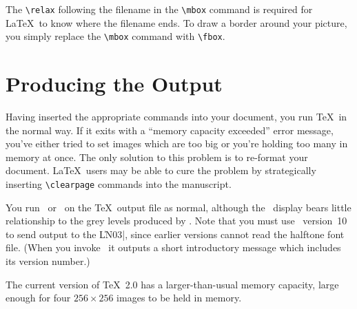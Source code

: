 \noindent The \verb|\relax| following the filename in the \verb|\mbox| command
is required for \LaTeX\ to know where the filename ends. To draw a border
around your picture, you simply replace the \verb|\mbox| command with
\verb|\fbox|. 

\section{Producing the Output}

Having inserted the appropriate commands into your document, you run \TeX\ in
the normal way. If it exits with a ``memory capacity exceeded'' error message,
you've either tried to set images which are too big or you're holding too
many in memory at once.  The only solution to this problem is to re-format your
document. \LaTeX\ users may be able to cure the problem by strategically
inserting \verb"\clearpage" commands into the manuscript.

You run \TV\ or \TL\ on the \TeX\ output file as normal, although the \TV\
display bears little relationship to the grey levels produced by \TL. Note that
you must use \TL\ version~10 to send output to the \|LN03|, since earlier
versions cannot read the halftone font file. (When you invoke \TL\, it outputs
a short introductory message which includes its version number.) 

The current version of \TeX\ 2.0 has a larger-than-usual memory capacity,
\SYSDEP{Size of \TeX's memory.}
large enough for four $256 \times 256$ images to be held in memory.


